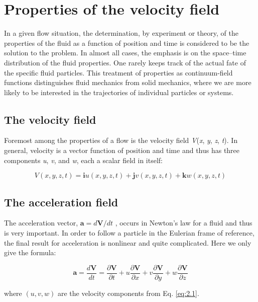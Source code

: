 \documentclass[12pt,twoside]{report}
\begin{document}
\section{Properties of the velocity field}
In a given flow situation, the determination, by experiment or theory, of the properties of the fluid as a function of position and time is considered to be the solution to the problem. In almost all cases, the emphasis is on the space–time distribution of the fluid properties. One rarely keeps track of the actual fate of the specific fluid particles. This treatment of properties as continuum-field functions distinguishes fluid mechanics from solid mechanics, where we are more likely to be interested in the trajectories of individual particles or systems.

\subsection{The velocity field}
Foremost among the properties of a flow is the velocity field \textit{V}(\textit{x}, \textit{y}, \textit{z}, \textit{t}). In general, velocity is a vector function of position and time and thus has three
components \textit{u}, \textit{v}, and \textit{w}, each a scalar field in itself:

\begin{equation} \label{eq:2.1}
	V(x, y, z, t) = \textbf{i}u(x, y, z, t) + \textbf{j}v(x, y, z, t) + \textbf{k}w(x, y, z, t)
\end{equation}


\subsection{The acceleration field}
The acceleration vector, $ \textbf{a} = d\textbf{V}/dt $ , occurs in Newton’s law for a fluid and thus is
very important. In order to follow a particle in the Eulerian frame of reference, the final result for acceleration is nonlinear and quite complicated. Here we only give the formula:

\begin{equation} \label{eq:2.2}
	\textbf{a} = \dfrac{d\textbf{V}}{dt} = \dfrac{\partial \textbf{V}}{\partial t} + u \dfrac{\partial \textbf{V}}{\partial x} +  v \dfrac{\partial \textbf{V}}{\partial y} + w \dfrac{\partial \textbf{V}}{\partial z}
\end{equation}

where $(u, v, w)$ are the velocity components from Eq. \eqref{eq:2.1}. \cite{White}
\end{document}
